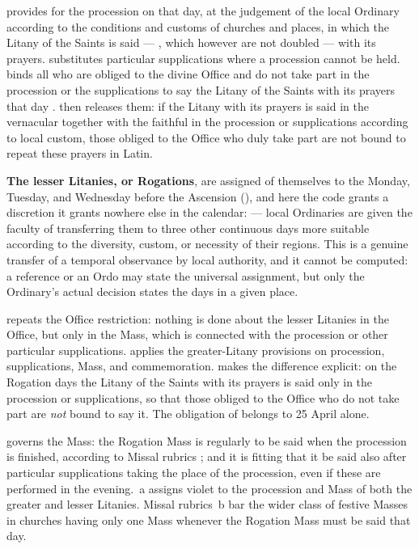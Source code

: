  provides for the procession on that day, at the judgement of the local Ordinary
according to the conditions and customs of churches and places, in which the Litany of the
Saints is said — , which however are not doubled — with its
prayers.  substitutes particular supplications where a procession cannot be held.
 binds all who are obliged to the divine Office and do not take part in the procession or
the supplications to say the Litany of the Saints with its prayers that day .  then releases them: if the Litany with its prayers is said in the vernacular
together with the faithful in the procession or supplications according to local custom, those
obliged to the Office who duly take part are not bound to repeat these prayers in Latin.

\textbf{The lesser Litanies, or Rogations}, are assigned of themselves to the Monday, Tuesday,
and Wednesday before the Ascension (), and here the code grants a discretion it grants
nowhere else in the calendar:  — local Ordinaries are given the faculty of transferring them to
three other continuous days more suitable according to the diversity, custom, or necessity of
their regions. This is a genuine transfer of a temporal observance by local authority, and it
cannot be computed: a reference or an Ordo may state the universal assignment, but only the
Ordinary's actual decision states the days in a given place.

 repeats the Office restriction: nothing is done about the lesser Litanies in the Office,
but only in the Mass, which is connected with the procession or other particular supplications.
 applies the greater-Litany provisions on procession, supplications, Mass, and
commemoration.  makes the difference explicit: on the Rogation days the Litany of the
Saints with its prayers is said only in the procession or supplications, so that those obliged
to the Office who do not take part are \emph{not} bound to say it. The obligation of 
belongs to 25 April alone.

 governs the Mass: the Rogation Mass is regularly to be said when the procession is
finished, according to Missal rubrics ; and it is fitting that it be said also
after particular supplications taking the place of the procession, even if these are performed
in the evening. \,a assigns violet to the procession and Mass of both the greater and
lesser Litanies. Missal rubrics \,b bar the wider class of festive Masses in churches
having only one Mass whenever the Rogation Mass must be said that day.
